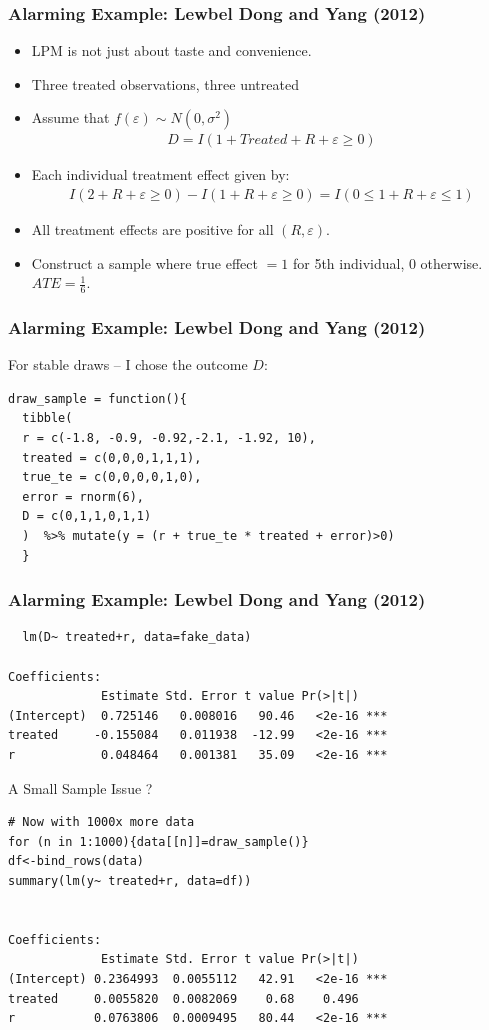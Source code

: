 \documentclass[xcolor=pdftex,dvipsnames,table,mathserif,aspectratio=169]{beamer}
\begin{document}
\begin{frame}
\frametitle{Alarming Example: Lewbel Dong and Yang (2012)}
\begin{itemize}
\item LPM is not just about taste and convenience.
\item Three treated observations, three untreated %
\item Assume that $f(\varepsilon) \sim N(0,\sigma^2)$
\begin{eqnarray*}
D = I ( 1 + Treated + R + \varepsilon \geq 0 ) 
\end{eqnarray*}
\item Each individual treatment effect given by:
\begin{eqnarray*}
 I ( 2 + R + \varepsilon \geq 0 ) -  I ( 1 + R + \varepsilon \geq 0 )  =  I ( 0 \leq 1 + R + \varepsilon \leq 1 ) 
\end{eqnarray*}
\item All treatment effects are positive for all $(R,\varepsilon)$.
\item Construct a sample where true effect $=1$ for 5th individual, 0 otherwise. $ATE= \frac{1}{6}$.
\end{itemize}
\end{frame}

\begin{frame}[fragile]
\frametitle{Alarming Example: Lewbel Dong and Yang (2012)}
For stable draws -- I chose the outcome $D$:
\begin{verbatim}
draw_sample = function(){
  tibble(
  r = c(-1.8, -0.9, -0.92,-2.1, -1.92, 10),
  treated = c(0,0,0,1,1,1),
  true_te = c(0,0,0,0,1,0),
  error = rnorm(6),
  D = c(0,1,1,0,1,1)
  )  %>% mutate(y = (r + true_te * treated + error)>0) 
  }
\end{verbatim}
\end{frame}


\begin{frame}[fragile]
\frametitle{Alarming Example: Lewbel Dong and Yang (2012)}
\begin{verbatim}
  lm(D~ treated+r, data=fake_data)
  
Coefficients:
             Estimate Std. Error t value Pr(>|t|)    
(Intercept)  0.725146   0.008016   90.46   <2e-16 ***
treated     -0.155084   0.011938  -12.99   <2e-16 ***
r            0.048464   0.001381   35.09   <2e-16 ***
\end{verbatim}
\end{frame}

\begin{frame}[fragile]{A Small Sample Issue ?}
\begin{verbatim}
# Now with 1000x more data
for (n in 1:1000){data[[n]]=draw_sample()}
df<-bind_rows(data)
summary(lm(y~ treated+r, data=df))


Coefficients:
             Estimate Std. Error t value Pr(>|t|)    
(Intercept) 0.2364993  0.0055112   42.91   <2e-16 ***
treated     0.0055820  0.0082069    0.68    0.496    
r           0.0763806  0.0009495   80.44   <2e-16 ***
\end{verbatim}

\end{frame}
\end{document}
